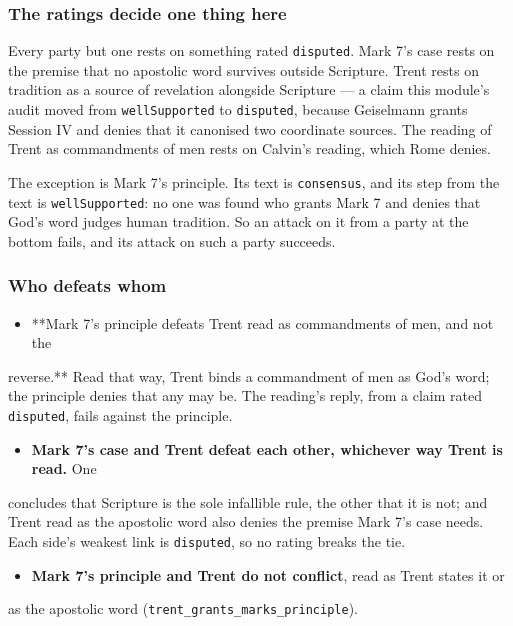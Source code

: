 \documentclass[11pt]{article}
\begin{document}
\subsubsection*{The ratings decide one thing here}
Every party but one rests on something rated \texttt{disputed}. Mark 7's case rests on the premise that no apostolic word survives outside Scripture. Trent rests on tradition as a source of revelation alongside Scripture — a claim this module's audit moved from \texttt{well\allowbreak{}Supported} to \texttt{disputed}, because Geiselmann grants Session IV and denies that it canonised two coordinate sources. The reading of Trent as commandments of men rests on Calvin's reading, which Rome denies.

The exception is Mark 7's principle. Its text is \texttt{consensus}, and its step from the text is \texttt{well\allowbreak{}Supported}: no one was found who grants Mark 7 and denies that God's word judges human tradition. So an attack on it from a party at the bottom fails, and its attack on such a party succeeds.

\subsubsection*{Who defeats whom}
\begin{itemize}
  \item **Mark 7's principle defeats Trent read as commandments of men, and not the
\end{itemize}
  reverse.** Read that way, Trent binds a commandment of men as God's word; the   principle denies that any may be. The reading's reply, from a claim rated   \texttt{disputed}, fails against the principle.

\begin{itemize}
  \item \textbf{Mark 7's case and Trent defeat each other, whichever way Trent is read.} One
\end{itemize}
  concludes that Scripture is the sole infallible rule, the other that it is   not; and Trent read as the apostolic word also denies the premise Mark 7's case   needs. Each side's weakest link is \texttt{disputed}, so no rating breaks the tie.

\begin{itemize}
  \item \textbf{Mark 7's principle and Trent do not conflict}, read as Trent states it or
\end{itemize}
  as the apostolic word (\texttt{trent\_\allowbreak{}grants\_\allowbreak{}marks\_\allowbreak{}principle}).
\end{document}
